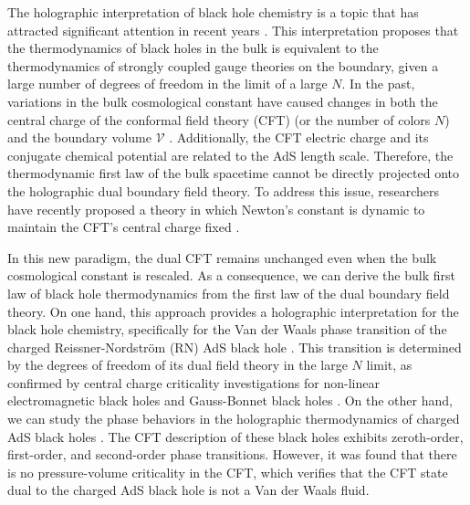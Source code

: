 \documentclass[a4paper,11pt]{article}
\begin{document}
The holographic interpretation of black hole chemistry is a topic that has attracted significant attention in recent years \cite{Kastor:2014dra,Dolan:2014cja,Zhang:2014uoa}. This interpretation proposes that the thermodynamics of black holes in the bulk is equivalent to the thermodynamics of strongly coupled gauge theories on the boundary, given a large number of degrees of freedom in the limit of a large $N$. In the past, variations in the bulk cosmological constant have caused changes in both the central charge of the conformal field theory (CFT) (or the number of colors $N$) and the boundary volume $\mathcal{V}$ \cite{Karch:2015rpa}. Additionally, the CFT electric charge and its conjugate chemical potential are related to the AdS length scale. Therefore, the thermodynamic first law of the bulk spacetime cannot be directly projected onto the holographic dual boundary field theory. To address this issue, researchers have recently proposed a theory in which Newton's constant is dynamic to maintain the CFT's central charge fixed \cite{Visser:2021eqk, Cong:2021fnf, Cong:2021jgb}.





In this new paradigm, the dual CFT remains unchanged even when the bulk cosmological constant is rescaled. As a consequence, we can derive the bulk first law of black hole thermodynamics from the first law of the dual boundary field theory.  On one hand, this approach provides a holographic interpretation for the black hole chemistry, specifically for the Van der Waals phase transition of the charged Reissner-Nordström (RN) AdS black hole \cite{Cong:2021fnf}. This transition is determined by the degrees of freedom of its dual field theory in the large $N$ limit, as confirmed by central charge criticality investigations for non-linear electromagnetic black holes \cite{Kumar:2022fyq,Bai:2022vmx} and Gauss-Bonnet black holes \cite{Kumar:2022afq,Qu:2022nrt}. On the other hand, we can study the phase behaviors in the holographic thermodynamics of charged AdS black holes \cite{Cong:2021jgb}. The CFT description of these black holes exhibits zeroth-order, first-order, and second-order phase transitions. However, it was found that there is no pressure-volume criticality in the CFT, which verifies that the CFT state dual to the charged AdS black hole is not a Van der Waals fluid.
\end{document}
